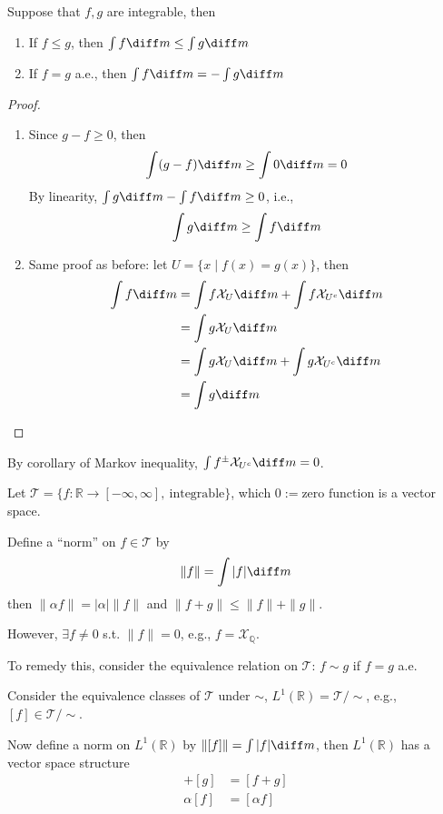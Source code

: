 \begin{corollary}
Suppose that $f,g$ are integrable, then 
\begin{enumerate}
\item
If $f\le g$, then $\int f\diff m\le \int g\diff m$
\item
If $f=g$ a.e., then $\int f\diff m = -\int g\diff m$
\end{enumerate}
\end{corollary}
\begin{proof}
\begin{enumerate}
\item
Since $g-f\ge0$, then
\[
\int(g-f)\diff m\ge\int0\diff m=0
\]
By linearity, $\int g\diff m-\int f\diff m\ge0$, i.e.,
\[
\int g\diff m\ge \int f\diff m
\]
\item
Same proof as before:
let $U=\{x\mid f(x)=g(x)\}$, then 
\begin{align*}
\int f\diff m&=\int f\mathcal{X}_U\diff m
+
\int f\mathcal{X}_{U^c}\diff m\\
&=\int g\mathcal{X}_U\diff m\\
&=\int g\mathcal{X}_U\diff m+\int g\mathcal{X}_{U^c}\diff m\\
&=\int g\diff m
\end{align*}


\end{enumerate}
\end{proof}
By corollary of Markov inequality, $\int f^{\pm}\mathcal{X}_{U^c}\diff m=0$.


\begin{remark}
Let $\mathcal{T}=\{f:\mathbb{R}\to[-\infty,\infty],\ \text{integrable}\}$, which $0:=\text{zero function}$ is a vector space.

Define a ``norm'' on $f\in\mathcal{T}$ by
\[
\|f\|=\int|f|\diff m
\]
then $\|\alpha f\|=|\alpha|\|f\|$ and $\|f+g\|\le\|f\|+\|g\|$.

However, $\exists f\ne0$ s.t. $\|f\|=0$, e.g., $f=\mathcal{X}_{\mathbb{Q}}$.
\end{remark}
To remedy this, consider the equivalence relation on $\mathcal{T}$: $f\sim g$ if $f=g$ a.e.

Consider the equivalence classes of $\mathcal{T}$ under $\sim$, $L^1(\mathbb{R}) = \mathcal{T}/\sim$, e.g., $[f]\in\mathcal{T}/\sim$.

Now define a norm on $L^1(\mathbb{R})$ by $\|[f]\| = \int|f|\diff m$, then $L^1(\mathbb{R})$ has a vector space structure
\begin{align*}
[f]+[g]&=[f+g]\\
\alpha[f]&=[\alpha f]
\end{align*}


